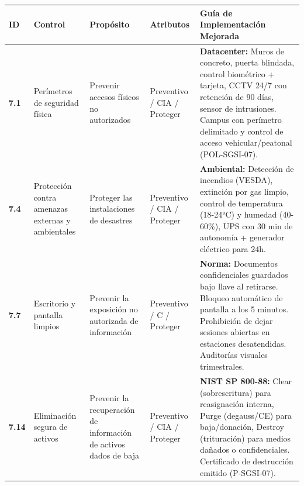 \documentclass[10pt,letterpaper]{article}
\begin{document}
{\setlength{\RaggedRightRightskip}{0pt plus 5em}\small\sloppy \begin{longtable}[]{@{}
  >{\hspace{0pt}\RaggedRight\arraybackslash}p{}
  >{\hspace{0pt}\RaggedRight\arraybackslash}p{}
  >{\hspace{0pt}\RaggedRight\arraybackslash}p{}
  >{\hspace{0pt}\RaggedRight\arraybackslash}p{}
  >{\hspace{0pt}\RaggedRight\arraybackslash}p{}@{}}
\toprule\noalign{}
\begin{minipage}[b]{\linewidth}\raggedright
ID
\end{minipage} & \begin{minipage}[b]{\linewidth}\raggedright
Control
\end{minipage} & \begin{minipage}[b]{\linewidth}\raggedright
Propósito
\end{minipage} & \begin{minipage}[b]{\linewidth}\raggedright
Atributos
\end{minipage} & \begin{minipage}[b]{\linewidth}\raggedright
Guía de Implementación Mejorada
\end{minipage} \\
\midrule\noalign{}
\endhead
\bottomrule\noalign{}
\endlastfoot
\textbf{7.1} & Perímetros de seguridad física & Prevenir accesos físicos
no autorizados & Preventivo / CIA / Proteger & \textbf{Datacenter:}
Muros de concreto, puerta blindada, control biométrico + tarjeta, CCTV
24/7 con retención de 90 días, sensor de intrusiones. Campus con
perímetro delimitado y control de acceso vehicular/peatonal
(POL-SGSI-07). \\
\textbf{7.4} & Protección contra amenazas externas y ambientales &
Proteger las instalaciones de desastres & Preventivo / CIA / Proteger &
\textbf{Ambiental:} Detección de incendios (VESDA), extinción por gas
limpio, control de temperatura (18-24°C) y humedad (40-60\%), UPS con 30
min de autonomía + generador eléctrico para 24h. \\
\textbf{7.7} & Escritorio y pantalla limpios & Prevenir la exposición no
autorizada de información & Preventivo / C / Proteger & \textbf{Norma:}
Documentos confidenciales guardados bajo llave al retirarse. Bloqueo
automático de pantalla a los 5 minutos. Prohibición de dejar sesiones
abiertas en estaciones desatendidas. Auditorías visuales
trimestrales. \\
\textbf{7.14} & Eliminación segura de activos & Prevenir la recuperación
de información de activos dados de baja & Preventivo / CIA / Proteger &
\textbf{NIST SP 800-88:} Clear (sobrescritura) para reasignación
interna, Purge (degauss/CE) para baja/donación, Destroy (trituración)
para medios dañados o confidenciales. Certificado de destrucción emitido
(P-SGSI-07). \\
\end{longtable}\normalsize}
\end{document}
